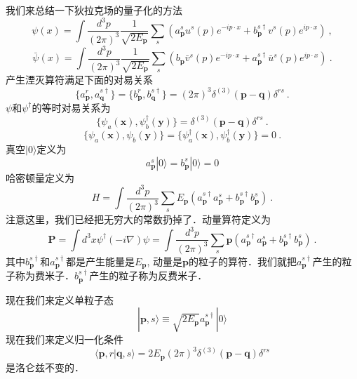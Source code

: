 
我们来总结一下狄拉克场的量子化的方法
\begin{equation}
\psi(x) = \int \frac{d^3 p}{(2\pi)^3} \frac{1}{\sqrt{2 E_{\mathbf p}}} \sum_s (a_{\mathbf p}^s u^s (p) e^{-ip\cdot x} + b_{\mathbf p}^{s\dagger} v^s(p) e^{ip\cdot x})~,
\end{equation}
\begin{equation}
\bar \psi (x) = \int \frac{d^3 p}{(2\pi)^3} \frac{1}{\sqrt{2 E_{\mathbf p}}} \sum_s (b_{\mathbf p}\bar v ^s(p) e^{- i p\cdot x}+ a_{\mathbf p}^{s\dagger} \bar u^s(p)e^{i p \cdot x})~.
\end{equation}
产生湮灭算符满足下面的对易关系
\begin{equation}
\{a_{\mathbf p}^r,a_{\mathbf q}^{s\dagger}\} = \{b_{\mathbf p}^r,b_{\mathbf q}^{s\dagger}\} = (2\pi)^3\delta^{(3)}(\mathbf p - \mathbf q)\delta^{rs}~.
\end{equation}
$\psi$和$\psi^\dagger$的等时对易关系为
\begin{equation}
\{\psi_a(\mathbf x),\psi_b^\dagger(\mathbf y)\} = \delta^{(3)}(\mathbf p - \mathbf q)\delta^{rs}~.
\end{equation}
\begin{equation}
\{\psi_a(\mathbf x),\psi_b(\mathbf y)\} = \{\psi_a^\dagger(\mathbf x),\psi_b^\dagger(\mathbf y)\} = 0 ~.
\end{equation}
真空$|0\rangle$定义为
\begin{equation}
a_{\mathbf p }^s|0\rangle = b_{\mathbf p}^s|0\rangle = 0
\end{equation}
哈密顿量定义为
\begin{equation}
H = \int \frac{d^3p}{(2\pi)^3}\sum_s E_{\mathbf p} (a^{s\dagger}_{\mathbf p}a^{s}_{\mathbf p}+b^{s\dagger}_{\mathbf p}b_{\mathbf p}^s)~.
\end{equation}
注意这里，我们已经把无穷大的常数扔掉了．动量算符定义为
\begin{equation}
\mathbf P = \int d^3 x \psi^\dagger (-i\nabla)\psi = \int \frac{d^3 p}{(2\pi)^3} \sum_s \mathbf p (a_{\mathbf p}^{s\dagger} a_{\mathbf p}^s+b_{\mathbf p}^{s\dagger}b_{\mathbf p}^s)~.
\end{equation}
其中$b_{\mathbf p}^{s\dagger}$和$a_{\mathbf p}^{s\dagger}$都是产生能量是$E_{\mathbf p}$, 动量是$\mathbf p$的粒子的算符．我们就把$a_{\mathbf p}^{s\dagger}$产生的粒子称为费米子．$b_{\mathbf p}^{s\dagger}$产生的粒子称为反费米子．

现在我们来定义单粒子态
\begin{equation}
|\mathbf p,s\rangle \equiv \sqrt{2 E_{\mathbf p}} a_{\mathbf p}^{s\dagger} | 0 \rangle 
\end{equation}
现在我们来定义归一化条件
\begin{equation}
\langle \mathbf p,r|\mathbf q,s\rangle = 2 E_{\mathbf p}(2\pi)^3\delta^{(3)}(\mathbf p - \mathbf q) \delta^{rs}
\end{equation}
是洛仑兹不变的．
















